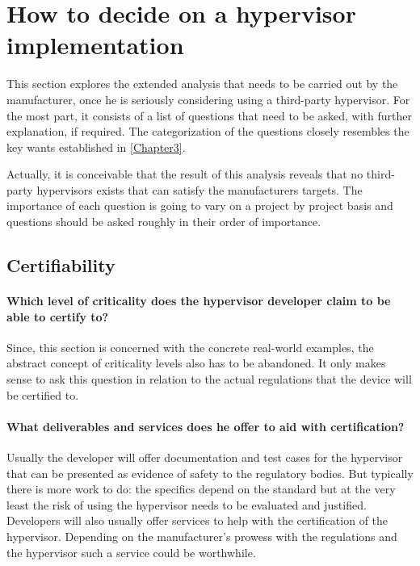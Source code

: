 
\section{How to decide on a hypervisor implementation} \label{how-to-decide}
This section explores the extended analysis that needs to be carried out by the manufacturer, once he is seriously considering using a third-party hypervisor. For the most part, it consists of a list of questions that need to be asked, with further explanation, if required. The categorization of the questions closely resembles the key wants established in \ref{Chapter3}.

Actually, it is conceivable that the result of this analysis reveals that no third-party hypervisors exists that can satisfy the manufacturers targets. The importance of each question is going to vary on a project by project basis and questions should be asked roughly in their order of importance. 

\subsection{Certifiability}
\paragraph{Which level of criticality does the hypervisor developer claim to be able to certify to?}
Since, this section is concerned with the concrete real-world examples, the abstract concept of criticality levels also has to be abandoned. It only makes sense to ask this question in relation to the actual regulations that the device will be certified to.

\paragraph{What deliverables and services does he offer to aid with certification?}
Usually the developer will offer documentation and test cases for the hypervisor that can be presented as evidence of safety to the regulatory bodies. But typically there is more work to do: the specifics depend on the standard but at the very least the risk of using the hypervisor needs to be evaluated and justified. Developers will also usually offer services to help with the certification of the hypervisor. Depending on the manufacturer's prowess with the regulations and the hypervisor such a service could be worthwhile.
